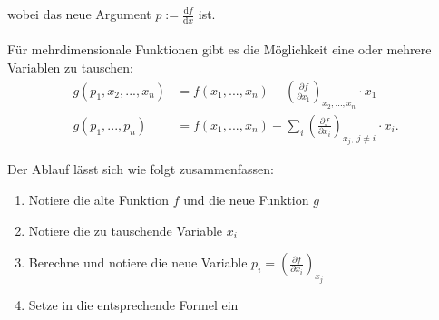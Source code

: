 \documentclass{article}
\newcommand{\diff}{\mathrm{d}}
\newcommand{\lr}[1]{\left(#1\right)}
\begin{document}
wobei das neue Argument $p := \frac{\diff f}{\diff x}$ ist.\\
\\
Für mehrdimensionale Funktionen gibt es die Möglichkeit eine oder mehrere Variablen zu tauschen:
	\begin{align*}
		g(p_1, x_2, ..., x_n) &= f(x_1,...,x_n) - \lr{ \frac{\partial f}{\partial x_1} }_{x_2,...,x_n} \cdot x_1 \\
		g(p_1, ..., p_n) &= f(x_1,...,x_n) - \sum_{i} \lr{ \frac{\partial f}{\partial x_i} }_{x_j,\ j\neq i} \cdot x_i.
	\end{align*}

Der Ablauf lässt sich wie folgt zusammenfassen:
		\begin{enumerate}
			\item Notiere die alte Funktion $f$ und die neue Funktion $g$
			\item Notiere die zu tauschende Variable $x_i$
			\item Berechne und notiere die neue Variable $p_i = \lr{ \frac{\partial f}{\partial x_i} }_{x_j}$
			\item Setze in die entsprechende Formel ein
		\end{enumerate}


\newpage
\end{document}
